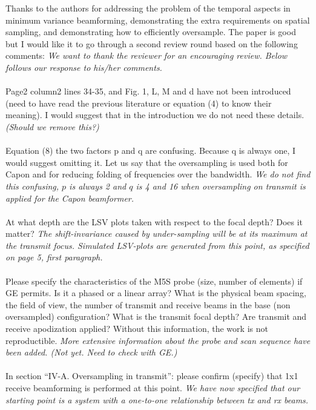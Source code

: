 \documentclass{article}
\begin{document}
Thanks to the authors for addressing the problem of the temporal aspects in minimum variance beamforming, demonstrating the extra requirements on spatial sampling, and demonstrating how to efficiently oversample. The paper is good but I would like it to go through a second review round based on the following comments:
\textit{We want to thank the reviewer for an encouraging review. Below follows our response to his/her comments.}
\\\\
Page2 column2 lines 34-35, and Fig. 1, L, M and d have not been introduced (need to have read the previous literature or equation (4) to know their meaning). I would suggest that in the introduction we do not need these details.
\textit{(Should we remove this?)}
\\\\
Equation (8) the two factors p and q are confusing. Because q is always one, I would suggest omitting it.  Let us say that the oversampling is used both for Capon and for reducing folding of frequencies over the bandwidth.
\textit{We do not find this confusing, $p$ is always 2 and $q$ is 4 and 16 when oversampling on transmit is applied for the Capon beamformer.}
\\\\
At what depth are the LSV plots taken with respect to the focal depth? Does it matter?
\textit{The shift-invariance caused by under-sampling will be at its maximum at the transmit focus. Simulated LSV-plots are generated from this point, as specified on page 5, first paragraph.}
\\\\
Please specify the characteristics of the M5S probe (size, number of elements) if GE permits. Is it a phased or a linear array? What is the physical beam spacing, the field of view, the number of transmit and receive beams in the base (non oversampled) configuration? What is the transmit focal depth? Are transmit and receive apodization applied? Without this information, the work is not reproductible.
\textit{More extensive information about the probe and scan sequence have been added. (Not yet. Need to check with GE.)}
\\\\
In section “IV-A. Oversampling in transmit”: please confirm (specify) that 1x1 receive beamforming is performed at this point.
\textit{We have now specified that our starting point is a system with a one-to-one relationship between tx and rx beams.}
\\\\
\end{document}
